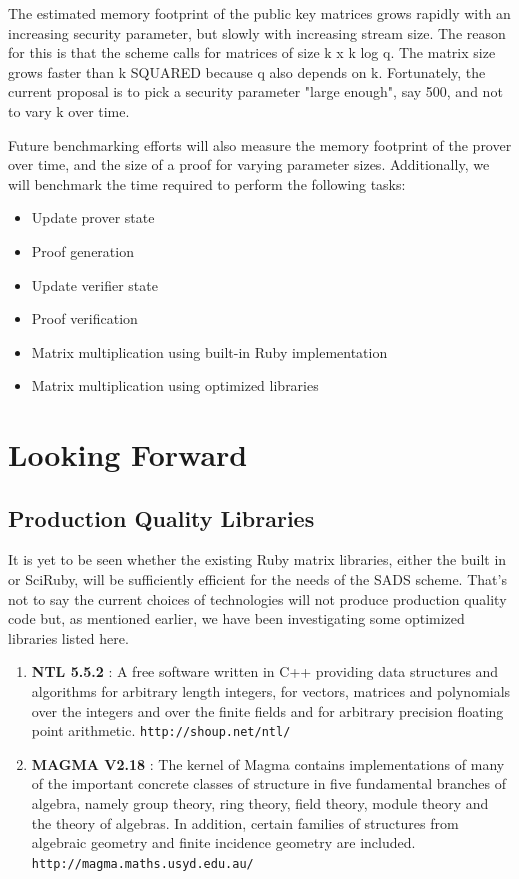 \documentclass[11pt, letterpaper, oneside]{article}
\begin{document}
	The estimated memory footprint of the public key matrices grows rapidly with an increasing security parameter, but slowly with increasing stream size.
	The reason for this is that the scheme calls for matrices of size k x k log q.
	The matrix size grows faster than k SQUARED because q also depends on k.
	Fortunately, the current proposal is to pick a security parameter "large enough", say 500, and not to vary k over time.
	
	Future benchmarking efforts will also measure the memory footprint of the prover over time, and the size of a proof for varying parameter sizes.
	Additionally, we will benchmark the time required to perform the following tasks:
	
	\begin{itemize}
	\item Update prover state	
	\item Proof generation
	\item Update verifier state
	\item Proof verification
	\item Matrix multiplication using built-in Ruby implementation
	\item Matrix multiplication using optimized libraries
	\end{itemize}
	
	
	
\section{Looking Forward}

	\subsection{Production Quality Libraries}
	It is yet to be seen whether the existing Ruby matrix libraries, either the built in or SciRuby, 
	will be sufficiently efficient for the needs of the SADS scheme. That's not to say the current 
	choices of technologies will not produce production quality code but, as mentioned earlier, we have
	been investigating some optimized libraries listed here.

	\begin{enumerate}
	\item \textbf{NTL 5.5.2} : A free software written in C++ providing data structures and algorithms for arbitrary length integers, for vectors, matrices and polynomials over the integers and over the finite fields and for arbitrary precision floating point arithmetic. \texttt{http://shoup.net/ntl/}
	\item \textbf{MAGMA V2.18} : The kernel of Magma contains implementations of many of the important concrete classes of structure in five fundamental branches of algebra, namely group theory, ring theory, field theory, module theory and the theory of algebras.
	In addition, certain families of structures from algebraic geometry and finite incidence geometry are included. \texttt{http://magma.maths.usyd.edu.au/}
	\end{enumerate}
\end{document}

